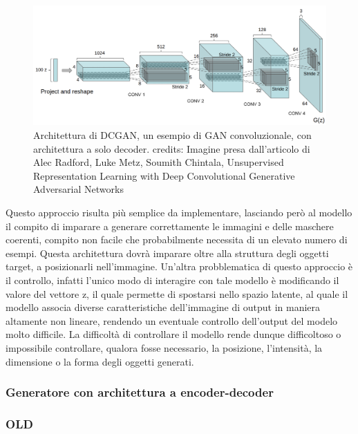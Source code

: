     \begin{figure}[H]
        \centering
        \includegraphics[width=1.0\textwidth]{imgs/DCGAN_architecture_crop.png}
        \caption{Architettura di DCGAN, un esempio di GAN convoluzionale, con architettura a solo decoder.
        credits: Imagine presa dall'articolo di Alec Radford, Luke Metz, Soumith Chintala,
        Unsupervised Representation Learning with Deep Convolutional Generative Adversarial Networks}
        \label{fig:dcgan_architecture}
    \end{figure}

    Questo approccio risulta più semplice da implementare, lasciando però al modello il compito di imparare a generare correttamente
    le immagini e delle maschere coerenti, compito non facile che probabilmente necessita di un elevato numero di esempi. 
    Questa architettura dovrà imparare oltre alla struttura degli oggetti target, a posizionarli nell'immagine.
    Un'altra probblematica di questo approccio è il controllo, infatti l'unico modo di interagire con tale modello è modificando il valore
    del vettore z, il quale permette di spostarsi nello spazio latente, al quale il modello associa diverse caratteristiche dell'immagine
    di output in maniera altamente non lineare, rendendo un eventuale controllo dell'output del modelo molto difficile.
    La difficoltà di controllare il modello rende dunque difficoltoso o impossibile controllare, qualora fosse necessario, la posizione, l'intensità,
    la dimensione o la forma degli oggetti generati.

\subsubsection{Generatore con architettura a encoder-decoder}
    
        

\subsubsection{OLD}

